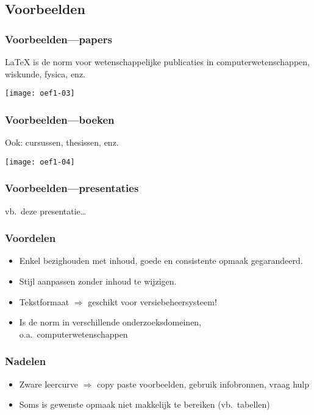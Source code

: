 \documentclass[aspectratio=169]{beamer}
\begin{document}
\subsection{Voorbeelden}

\begin{frame}
  \frametitle{Voorbeelden---papers}

  {\LaTeX} is de norm voor wetenschappelijke publicaties in computerwetenschappen, wiskunde, fysica, enz.

  \begin{center}
    \texttt{[image: oef1-03]}
  \end{center}

\end{frame}

\begin{frame}
  \frametitle{Voorbeelden---boeken}

  Ook: cursussen, thesissen, enz.

  \begin{center}
    \texttt{[image: oef1-04]}
  \end{center}

\end{frame}

\begin{frame}
  \frametitle{Voorbeelden---presentaties}

  \begin{center}
    vb.\ deze presentatie\ldots
  \end{center}

\end{frame}

\begin{frame}
  \frametitle{Voordelen}

  \begin{itemize}
    \item<+-> Enkel bezighouden met inhoud, goede en consistente opmaak gegarandeerd.
    \item <+-> Stijl aanpassen zonder inhoud te wijzigen.
    \item<+-> Tekstformaat \(\Rightarrow\) geschikt voor versiebeheersysteem!
    \item<+-> Is de norm in verschillende onderzoeksdomeinen, o.a.\ computerwetenschappen
  \end{itemize}
\end{frame}


\begin{frame}
  \frametitle{Nadelen}

  \begin{itemize}
    \item<+-> Zware leercurve \(\Rightarrow\) copy paste voorbeelden, gebruik infobronnen, vraag hulp
    \item<+-> Soms is gewenste opmaak niet makkelijk te bereiken (vb.~tabellen)
  \end{itemize}

\end{frame}
\end{document}
